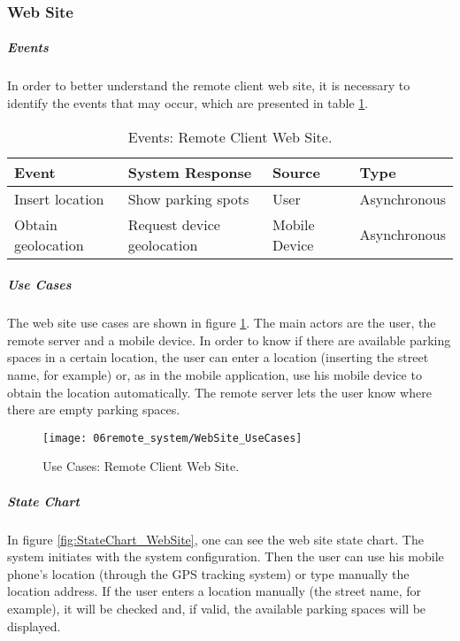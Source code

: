 \subsubsection*{Web Site}
\subparagraph*{Events}
In order to better understand the remote client web site, it is necessary to identify the events that may occur, which are presented in table \ref{table:rc_web_events}.

\begin{table}[ht]
	\centering
	\resizebox{\columnwidth}{!}
	{
		\begin{tabular}{|m{3cm}|m{5cm}|m{2.4cm}|m{2.4cm}|}
			\hline
			\textbf{Event} & \textbf{System Response} & \textbf{Source} & \textbf{Type}\\
			\hline\hline
			Insert location	& Show parking spots & User & Asynchronous\\
			\hline
			
			Obtain geolocation & Request device geolocation & Mobile Device & Asynchronous\\
			\hline
			
		\end{tabular}
	}
	\caption{Events: Remote Client Web Site.}
	\label{table:rc_web_events}
\end{table}

\subparagraph*{Use Cases}
The web site use cases are shown in figure \ref{fig:UseCases_WebSite}. The main actors are the user, the remote server and a mobile device. In order to know if there are available parking spaces in a certain location, the user can enter a location (inserting the street name, for example) or, as in the mobile application, use his mobile device to obtain the location automatically. The remote server lets the user know where there are empty parking spaces.

\begin{figure}[H]
	\centering
	\texttt{[image: 06remote\_system/WebSite\_UseCases]}
	\caption{Use Cases: Remote Client Web Site.}
	\label{fig:UseCases_WebSite}
\end{figure}

\clearpage
\subparagraph*{State Chart}
In figure \ref{fig:StateChart_WebSite}, one can see the web site state chart. The system initiates with the system configuration. Then the user can use his mobile phone's location (through the GPS tracking system) or type manually the location address. If the user enters a location manually (the street name, for example), it will be checked and, if valid, the available parking spaces will be displayed.

